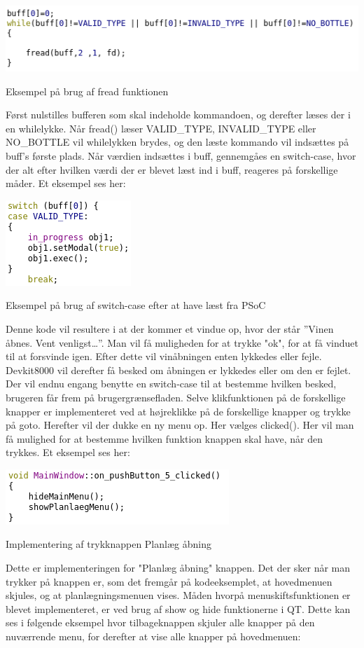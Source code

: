 \includegraphics{Billeder/read}
\caption{Eksempel på brug af fread funktionen}

Først nulstilles bufferen som skal indeholde kommandoen, og derefter læses der i en whilelykke. Når fread() læser VALID_TYPE, INVALID_TYPE eller NO_BOTTLE vil whilelykken brydes, og den læste kommando vil indsættes på buff’s første plads. Når værdien indsættes i buff, gennemgåes en switch-case, hvor der alt efter hvilken værdi der er blevet læst ind i buff, reageres på forskellige måder. Et eksempel ses her:

\includegraphics{Billeder/switch}
\caption{Eksempel på brug af switch-case efter at have læst fra PSoC}

Denne kode vil resultere i at der kommer et vindue op, hvor der står ”Vinen åbnes. Vent venligst…”. Man vil få muligheden for at trykke "ok", for at få vinduet til at forsvinde igen. 
Efter dette vil vinåbningen enten lykkedes eller fejle. Devkit8000 vil derefter få besked om åbningen er lykkedes eller om den er fejlet. Der vil endnu engang benytte en switch-case til at bestemme hvilken besked, brugeren får frem på brugergrænsefladen.
Selve klikfunktionen på de forskellige knapper er implementeret ved at højreklikke på de forskellige knapper og trykke på goto. Herefter vil der dukke en ny menu op. Her vælges clicked(). Her vil man få mulighed for at bestemme hvilken funktion knappen skal have, når den trykkes. Et eksempel ses her:

\includegraphics{Billeder/pushButton}
\caption{Implementering af trykknappen Planlæg åbning}

Dette er implementeringen for "Planlæg åbning" knappen. Det der sker når man trykker på knappen er, som det fremgår på kodeeksemplet, at hovedmenuen skjules, og at planlægningsmenuen vises. 
Måden hvorpå menuskiftsfunktionen er blevet implementeret, er ved brug af show og hide funktionerne i QT. Dette kan ses i følgende eksempel hvor tilbageknappen skjuler alle knapper på den nuværrende menu, for derefter at vise alle knapper på hovedmenuen:

